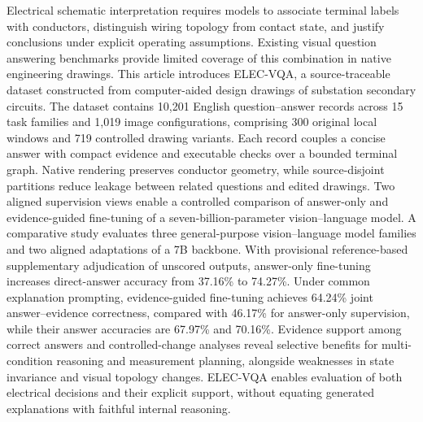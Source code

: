 Electrical schematic interpretation requires models to associate terminal labels with conductors, distinguish wiring topology from contact state, and justify conclusions under explicit operating assumptions. Existing visual question answering benchmarks provide limited coverage of this combination in native engineering drawings. This article introduces ELEC-VQA, a source-traceable dataset constructed from computer-aided design drawings of substation secondary circuits. The dataset contains 10,201 English question--answer records across 15 task families and 1,019 image configurations, comprising 300 original local windows and 719 controlled drawing variants. Each record couples a concise answer with compact evidence and executable checks over a bounded terminal graph. Native rendering preserves conductor geometry, while source-disjoint partitions reduce leakage between related questions and edited drawings. Two aligned supervision views enable a controlled comparison of answer-only and evidence-guided fine-tuning of a seven-billion-parameter vision--language model. A comparative study evaluates three general-purpose vision--language model families and two aligned adaptations of a 7B backbone. With provisional reference-based supplementary adjudication of unscored outputs, answer-only fine-tuning increases direct-answer accuracy from 37.16\% to 74.27\%. Under common explanation prompting, evidence-guided fine-tuning achieves 64.24\% joint answer--evidence correctness, compared with 46.17\% for answer-only supervision, while their answer accuracies are 67.97\% and 70.16\%. Evidence support among correct answers and controlled-change analyses reveal selective benefits for multi-condition reasoning and measurement planning, alongside weaknesses in state invariance and visual topology changes. ELEC-VQA enables evaluation of both electrical decisions and their explicit support, without equating generated explanations with faithful internal reasoning.
